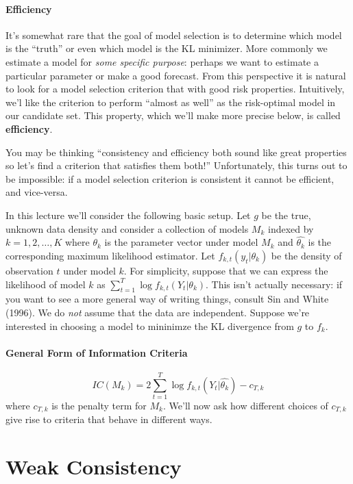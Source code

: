 \paragraph{Efficiency} It's somewhat rare that the goal of model selection is to determine which model is the ``truth'' or even which model is the KL minimizer. More commonly we estimate a model for \emph{some specific purpose}: perhaps we want to estimate a particular parameter or make a good forecast. From this perspective it is natural to look for a model selection criterion that with good risk properties. Intuitively, we'l like the criterion to perform ``almost as well'' as the risk-optimal model in our candidate set. This property, which we'll make more precise below, is called \textbf{efficiency}. 

You may be thinking ``consistency and efficiency both sound like great properties so let's find a criterion that satisfies them both!'' Unfortunately, this turns out to be impossible: if a model selection criterion is consistent it cannot be efficient, and vice-versa. 


In this lecture we'll consider the following basic setup. Let $g$ be the true, unknown data density and consider a collection of models $M_k$ indexed by $k = 1, 2, \hdots, K$ where $\theta_k$ is the parameter vector under model $M_k$ and $\widehat{\theta_k}$ is the corresponding maximum likelihood estimator. Let $f_{k,t}(y_t|\theta_k)$ be the density of observation $t$ under model $k$. For simplicity, suppose that we can express the likelihood of model $k$ as $\sum_{t=1}^T \log f_{k,t}(Y_t| \theta_k)$. This isn't actually necessary: if you want to see a more general way of writing things, consult Sin and White (1996). We do \emph{not} assume that the data are independent. Suppose we're interested in choosing a model to mininimze the KL divergence from $g$ to $f_k$.




\paragraph{General Form of Information Criteria}
	$$IC(M_k) = 2 \sum_{t=1}^T \log f_{k,t}(Y_t| \widehat{\theta_k}) - c_{T,k}$$
where $c_{T,k}$ is the penalty term for $M_k$. We'll now ask how different choices of $c_{T,k}$ give rise to criteria that behave in different ways. 


\section{Weak Consistency}
